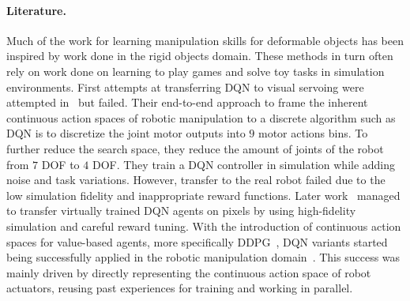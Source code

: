 \documentclass[\home/main.tex]{subfiles}
\begin{document}
 
\paragraph{Literature.}
Much of the work for learning manipulation skills for deformable objects has been inspired by work done in the rigid objects domain. These methods in turn often rely on work done on learning to play games and solve toy tasks in simulation environments. First attempts at transferring DQN to visual servoing were attempted in~\autocite{Zhang2015} but failed. Their end-to-end approach to frame the inherent continuous action spaces of robotic manipulation to a discrete algorithm such as DQN is to discretize the joint motor outputs into $9$ motor actions bins. To further reduce the search space, they reduce the amount of joints of the robot from $7$ DOF to $4$ DOF. They train a DQN controller in simulation while adding noise and task variations. However, transfer to the real robot failed due to the low simulation fidelity and inappropriate reward functions. Later work~\autocite{James2016} managed to transfer virtually trained DQN agents on pixels by using high-fidelity simulation and careful reward tuning. With the introduction of continuous action spaces for value-based agents, more specifically DDPG~\autocite{Lillicrap2015}, DQN variants started being successfully applied in the robotic manipulation domain~\autocite{Gu2017}. This success was mainly driven by directly representing the continuous action space of robot actuators, reusing past experiences for training and working in parallel.
\end{document}
